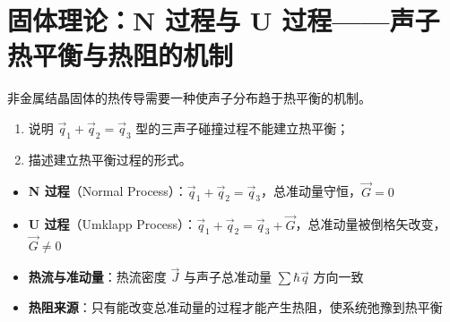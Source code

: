 \section{固体理论：N 过程与 U 过程——声子热平衡与热阻的机制}
\label{sec:nu-process-thermal-equilibrium}

\begin{modelbox}[题目：三声子碰撞与热平衡的建立]
非金属结晶固体的热传导需要一种使声子分布趋于热平衡的机制。
\begin{enumerate}
    \item 说明 $\vec q_1+\vec q_2=\vec q_3$ 型的三声子碰撞过程不能建立热平衡；
    \item 描述建立热平衡过程的形式。
\end{enumerate}
\end{modelbox}

\begin{tipbox}[考点快速分析]
\begin{itemize}
    \item \textbf{N 过程}（Normal Process）：$\vec q_1+\vec q_2=\vec q_3$，总准动量守恒，$\vec G=0$
    \item \textbf{U 过程}（Umklapp Process）：$\vec q_1+\vec q_2=\vec q_3+\vec G$，总准动量被倒格矢改变，$\vec G\neq0$
    \item \textbf{热流与准动量}：热流密度 $\vec J$ 与声子总准动量 $\sum\hbar\vec q$ 方向一致
    \item \textbf{热阻来源}：只有能改变总准动量的过程才能产生热阻，使系统弛豫到热平衡
\end{itemize}
\end{tipbox}

